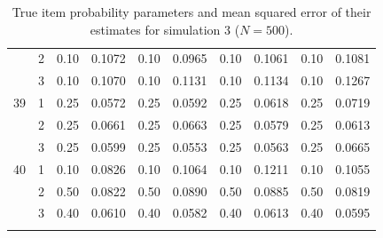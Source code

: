 \begin{longtable}{llcccccccc}
   & 2 & 0.10 & 0.1072 & 0.10 & 0.0965 & 0.10 & 0.1061 & 0.10 & 0.1081 \\ 
   & 3 & 0.10 & 0.1070 & 0.10 & 0.1131 & 0.10 & 0.1134 & 0.10 & 0.1267 \\ 
  39 & 1 & 0.25 & 0.0572 & 0.25 & 0.0592 & 0.25 & 0.0618 & 0.25 & 0.0719 \\ 
   & 2 & 0.25 & 0.0661 & 0.25 & 0.0663 & 0.25 & 0.0579 & 0.25 & 0.0613 \\ 
   & 3 & 0.25 & 0.0599 & 0.25 & 0.0553 & 0.25 & 0.0563 & 0.25 & 0.0665 \\ 
  40 & 1 & 0.10 & 0.0826 & 0.10 & 0.1064 & 0.10 & 0.1211 & 0.10 & 0.1055 \\ 
   & 2 & 0.50 & 0.0822 & 0.50 & 0.0890 & 0.50 & 0.0885 & 0.50 & 0.0819 \\ 
   & 3 & 0.40 & 0.0610 & 0.40 & 0.0582 & 0.40 & 0.0613 & 0.40 & 0.0595 \\ 
   \bottomrule
\caption{True item probability parameters and mean squared error of their estimates for simulation 3 ($N = 500$).} 
\label{table:sim3_item_prob_mse_N500}
\end{longtable}
